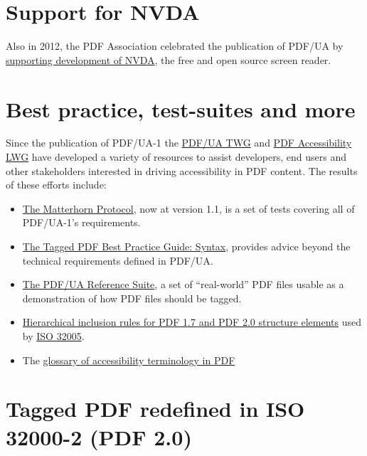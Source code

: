 \documentclass[12pt,a4paper]{article}
\begin{document}
\section{Support for NVDA}\label{support-for-nvda}

Also in 2012, the PDF Association celebrated the publication of PDF/UA
by
\href{https://pdfa.org/nvda-goes-pdfua-the-pdf-association-steps-up-to-fund-development-of-the-worlds-first-pdfua-conforming-screen-reader/}{supporting
development of NVDA}, the free and open source screen reader.

\section{Best practice, test-suites and
more}\label{best-practice-test-suites-and-more}

Since the publication of PDF/UA-1 the
\href{https://pdfa.org/community/pdf-ua-technical-working-group/}{PDF/UA
TWG} and
\href{https://pdfa.org/community/pdf-accessibility-liaison-working-group/}{PDF
Accessibility LWG} have developed a variety of resources to assist
developers, end users and other stakeholders interested in driving
accessibility in PDF content. The results of these efforts include:
\begin{itemize}
\item
  \href{https://pdfa.org/resource/the-matterhorn-protocol/}{The
  Matterhorn Protocol}, now at version 1.1, is a set of tests covering
  all of PDF/UA-1's requirements.
\item
  \href{https://pdfa.org/resource/tagged-pdf-best-practice-guide-syntax/}{The
  Tagged PDF Best Practice Guide: Syntax}, provides advice beyond the
  technical requirements defined in PDF/UA.
\item
  \href{https://pdfa.org/resource/pdfua-reference-suite/}{The PDF/UA
  Reference Suite}, a set of ``real-world'' PDF files usable as a
  demonstration of how PDF files should be tagged.
\item
  \href{https://pdfa.org/resource/iso-ts-32005-hierarchical-inclusion-rules/}{Hierarchical
  inclusion rules for PDF 1.7 and PDF 2.0 structure elements} used by
  \href{https://pdfa.org/resource/iso-32005/}{ISO 32005}.
\item
  The
  \href{https://pdfa.org/glossary-of-accessibility-terminology-in-pdf/}{glossary
  of accessibility terminology in PDF}
\end{itemize}

\section{Tagged PDF redefined in ISO 32000-2 (PDF
2.0)}\label{tagged-pdf-redefined-in-iso-32000-2-pdf-2.0}
\end{document}

